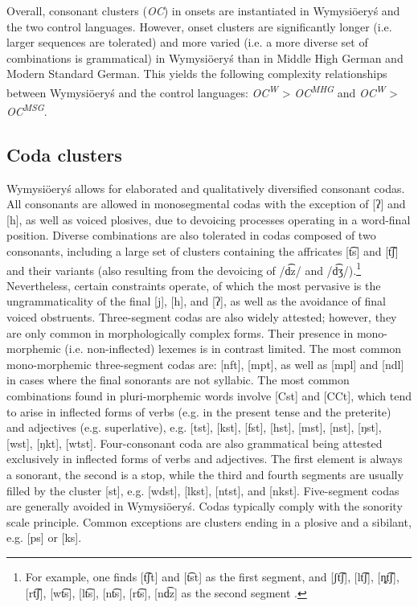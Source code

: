 \documentclass[output=paper,hidelinks]{langscibook}
\begin{document}
Overall, consonant clusters (\textit{OC}) in onsets are instantiated in Wymysiöeryś and the two control languages. However, onset clusters are significantly longer (i.e. larger sequences are tolerated) and more varied (i.e. a more diverse set of combinations is grammatical) in Wymysiöeryś than in Middle High German and Modern Standard German. This yields the following complexity relationships between Wymysiöeryś and the control languages: \textit{OC\textsuperscript{W}} > \textit{OC\textsuperscript{MHG}} and \textit{OC\textsuperscript{W}} > \textit{OC\textsuperscript{MSG}}.

\subsection{Coda clusters}\label{sec:wymsorys:3.12}

Wymysiöeryś allows for elaborated and qualitatively diversified consonant codas. All consonants are allowed in monosegmental codas with the exception of [ʔ] and [h], as well as voiced plosives, due to devoicing processes operating in a word-final position. Diverse combinations are also tolerated in codas composed of two consonants, including a large set of clusters containing the affricates [t͡s] and [t͡ʃ] and their variants (also resulting from the devoicing of /d͡z/ and /d͡ʒ/).\footnote{For example, one finds [t͡ʃt] and [t͡st] as the first segment, and [ʃt͡ʃ], [lt͡ʃ], [ȵt͡ʃ], [rt͡ʃ], [wt͡s], [lt͡s], [nt͡s], [rt͡s], [nd͡z] as the second segment \citep{Andrason2021}.} Nevertheless, certain constraints operate, of which the most pervasive is the ungrammaticality of the final [j], [h], and [ʔ], as well as the avoidance of final voiced obstruents. Three-segment codas are also widely attested; however, they are only common in morphologically complex forms. Their presence in mono-morphemic (i.e. non-inflected) lexemes is in contrast limited. The most common mono-morphemic three-segment codas are: [nft], [mpt], as well as [mpl] and [ndl] in cases where the final sonorants are not syllabic. The most common combinations found in pluri-morphemic words involve [Cst] and [CCt], which tend to arise in inflected forms of verbs (e.g. in the present tense and the preterite) and adjectives (e.g. superlative), e.g. [tst], [kst], [fst], [hst], [mst], [nst], [ŋst], [wst], [ŋkt], [wtst]. Four-consonant coda are also grammatical being attested exclusively in inflected forms of verbs and adjectives. The first element is always a sonorant, the second is a stop, while the third and fourth segments are usually filled by the cluster [st], e.g. [wdst], [lkst], [ntst], and [nkst]. Five-segment codas are generally avoided in Wymysiöeryś. Codas typically comply with the sonority scale principle. Common exceptions are clusters ending in a plosive and a sibilant, e.g. [ps] or [ks].
\end{document}
